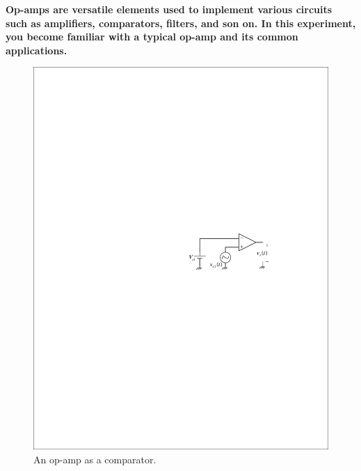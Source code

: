 \documentclass[11pt]{article}
\begin{document}
\textbf{Op-amps are versatile elements used to implement various circuits such as amplifiers, comparators, filters, and son on. In this experiment, you become familiar with a typical op-amp and its common applications.
}



\begin{question}


\begin{figure}[H]
\centering
\includegraphics[scale=1.2,angle=0]{Fig/cir1.pdf}
\caption{An op-amp as a comparator.} \label{fig:cir1}
\end{figure}


\end{question}
\end{document}
